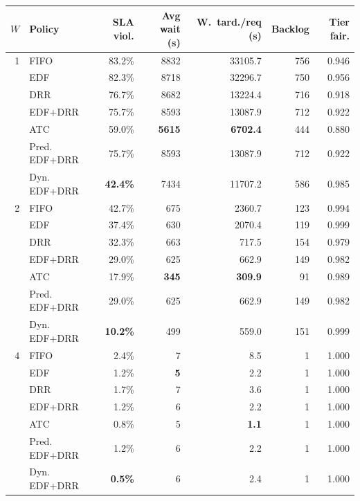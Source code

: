 \begin{tabular}{rlrrrrr}
\toprule
$W$ & Policy & SLA viol. & Avg wait (s) & W.\ tard./req (s) & Backlog & Tier fair. \\
\midrule
1 & FIFO & 83.2\% & 8832 & 33105.7 & 756 & 0.946 \\
 & EDF & 82.3\% & 8718 & 32296.7 & 750 & 0.956 \\
 & DRR & 76.7\% & 8682 & 13224.4 & 716 & 0.918 \\
 & EDF+DRR & 75.7\% & 8593 & 13087.9 & 712 & 0.922 \\
 & ATC & 59.0\% & \textbf{5615} & \textbf{6702.4} & 444 & 0.880 \\
 & Pred. EDF+DRR & 75.7\% & 8593 & 13087.9 & 712 & 0.922 \\
 & Dyn. EDF+DRR & \textbf{42.4\%} & 7434 & 11707.2 & 586 & 0.985 \\
\midrule
2 & FIFO & 42.7\% & 675 & 2360.7 & 123 & 0.994 \\
 & EDF & 37.4\% & 630 & 2070.4 & 119 & 0.999 \\
 & DRR & 32.3\% & 663 & 717.5 & 154 & 0.979 \\
 & EDF+DRR & 29.0\% & 625 & 662.9 & 149 & 0.982 \\
 & ATC & 17.9\% & \textbf{345} & \textbf{309.9} & 91 & 0.989 \\
 & Pred. EDF+DRR & 29.0\% & 625 & 662.9 & 149 & 0.982 \\
 & Dyn. EDF+DRR & \textbf{10.2\%} & 499 & 559.0 & 151 & 0.999 \\
\midrule
4 & FIFO & 2.4\% & 7 & 8.5 & 1 & 1.000 \\
 & EDF & 1.2\% & \textbf{5} & 2.2 & 1 & 1.000 \\
 & DRR & 1.7\% & 7 & 3.6 & 1 & 1.000 \\
 & EDF+DRR & 1.2\% & 6 & 2.2 & 1 & 1.000 \\
 & ATC & 0.8\% & 5 & \textbf{1.1} & 1 & 1.000 \\
 & Pred. EDF+DRR & 1.2\% & 6 & 2.2 & 1 & 1.000 \\
 & Dyn. EDF+DRR & \textbf{0.5\%} & 6 & 2.4 & 1 & 1.000 \\
\bottomrule
\end{tabular}
